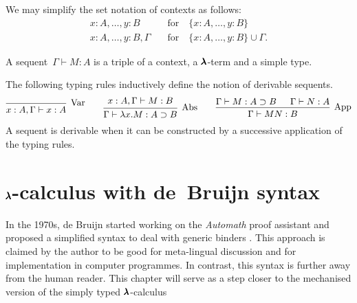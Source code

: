 \begin{notation} We may simplify the set notation of contexts as follows:
  \begin{align*}
    x:A, \dots, y:B         \quad &\text{for} \quad \{ x:A, \dots, y:B \} \\
    x:A, \dots, y:B, \Gamma \quad &\text{for} \quad \{ x:A, \dots, y:B \} \cup \Gamma.
  \end{align*}
\end{notation}

\begin{definition}[Sequent]
  A sequent~$\Gamma \vdash M:A$ is a triple of a context, a $\pmb{\lambda}$-term and a simple type.
\end{definition}

\begin{definition}
  \label{typing_rules}
  The following typing rules inductively define the notion of derivable sequents.
  \[
    \begin{prooftree}
      \infer0[Var]{ x:A, \Gamma \vdash x:A } 
    \end{prooftree}
    \qquad
    \begin{prooftree}
      \hypo{ x:A, \Gamma \vdash M:B }
      \infer1[Abs]{ \Gamma \vdash \lambda x . M : A \supset B  } 
    \end{prooftree}
    \qquad
    \begin{prooftree}
      \hypo{ \Gamma \vdash M : A \supset B }
      \hypo{ \Gamma \vdash N : A }	
      \infer2[App]{ \Gamma \vdash M N : B } 
    \end{prooftree}
  \]
  A sequent is derivable when it can be constructed by a successive application of the typing rules.  
\end{definition}


\section{$\pmb{\lambda}$-calculus with de~Bruijn syntax}

In the 1970s, de Bruijn started working on the \textit{Automath} proof assistant and proposed a simplified syntax to deal with generic binders \cite{deBruijn}.
This approach is claimed by the author to be good for meta-lingual discussion and for implementation in computer programmes.
In contrast, this syntax is further away from the human reader.
This chapter will serve as a step closer to the mechanised version of the simply typed $\pmb{\lambda}$-calculus


